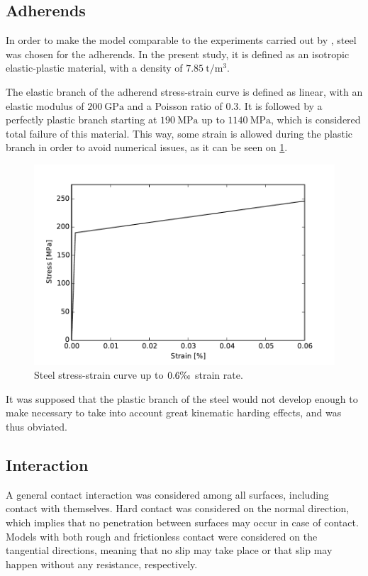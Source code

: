 \documentclass[cmfonts]{witpress}
\begin{document}
\subsection{Adherends}

In order to make the model comparable to the experiments carried out by \cite{Peroni2009}, steel was chosen for the adherends. In the present study, it is defined as an isotropic elastic-plastic material, with a density of $\SI{7.85}{\tonne/\m^3}$.

The elastic branch of the adherend stress-strain curve is defined as linear, with an elastic modulus of $\SI{200}{\GPa}$ and a Poisson ratio of $\num{0.3}$. It is followed by a perfectly plastic branch starting at $\SI{190}{\MPa}$ up to $\SI{1140}{\MPa}$, which is considered total failure of this material. This way, some strain is allowed during the plastic branch in order to avoid numerical issues, as it can be seen on \cref{fig:steel}.

\begin{figure}
	\centering
	\includegraphics[width=0.7\linewidth]{figures/IMG_CUTRES/steel}
	\caption{Steel stress-strain curve up to $\num{0.6}\text{\textperthousand}$ strain rate.}
	\label{fig:steel}
\end{figure}

It was supposed that the plastic branch of the steel would not develop enough to make necessary to take into account great kinematic harding effects, and was thus obviated.

\subsection{Interaction}

A general contact interaction was considered among all surfaces, including contact with themselves. Hard contact was considered on the normal direction, which implies that no penetration between surfaces may occur in case of contact. Models with both rough and frictionless contact were considered on the tangential directions, meaning that no slip may take place or that slip may happen without any resistance, respectively.
\end{document}

